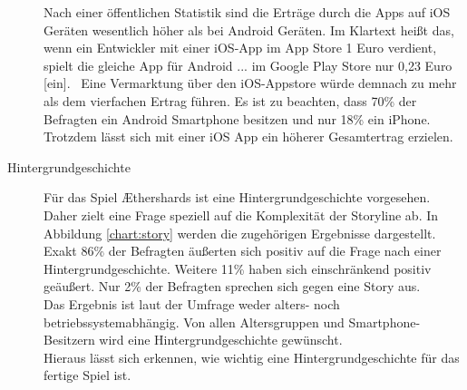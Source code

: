 \begin{description}
Nach einer öffentlichen Statistik sind die Erträge durch die Apps auf iOS Geräten wesentlich höher als bei Android Geräten. \glqq Im Klartext heißt das, wenn ein Entwickler mit einer iOS-App im App Store 1 Euro verdient, spielt die gleiche App für Android ... im Google Play Store nur 0,23 Euro [ein].\grqq\ \cite{Hesse:2012ws} Eine Vermarktung über den iOS-Appstore würde demnach zu mehr als dem vierfachen Ertrag führen. Es ist zu beachten, dass 70\% der Befragten ein Android Smartphone besitzen und nur 18\% ein iPhone. Trotzdem lässt sich mit einer iOS App ein höherer Gesamtertrag erzielen.






\item[Hintergrundgeschichte] 
Für das Spiel Æthershards ist eine Hintergrundgeschichte vorgesehen.  Daher zielt eine Frage speziell auf die Komplexität der Storyline ab. In Abbildung \ref{chart:story} werden die zugehörigen Ergebnisse dargestellt. 
Exakt 86\% der Befragten äußerten sich positiv auf die Frage nach einer Hintergrundgeschichte. 
Weitere 11\% haben sich einschränkend positiv geäußert. Nur 2\% der Befragten sprechen sich gegen eine Story aus. \\
Das Ergebnis ist laut der Umfrage weder alters- noch betriebssystemabhängig. Von allen Altersgruppen und Smartphone-Besitzern wird eine Hintergrundgeschichte gewünscht. \\ 
Hieraus lässt sich erkennen, wie wichtig eine Hintergrundgeschichte für das fertige Spiel ist. %



\end{description}
